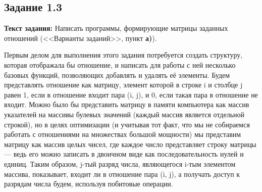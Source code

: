 \documentclass[12pt]{article}
\begin{document}
	
	\subsection{Задание 1.3}
	\label{subpart1_3}
	
	{\bf Текст задания:} Написать программы, формирующие матрицы заданных отношений (<<Варианты заданий>>, пункт {\bf а)}).
	
	Первым делом для выполнения этого задания потребуется создать структуру, которая отображала бы отношение, и написать для работы с ней несколько базовых функций, позволяющих добавлять и удалять её элементы. Будем представлять отношение как матрицу, элемент которой в строке i и столбце j равен 1, если в отношение входит пара (i, j), и 0, если такая пара в отношение не входит. Можно было бы представить матрицу в памяти компьютера как массив указателей на массивы булевых значений (каждый массив является отдельной строкой), но в целях оптимизации (и учитывая тот факт, что мы не собираемся работать с отношениями на множествах большой мощности) мы представим матрицу как массив целых чисел, где каждое число представляет строку матрицы --- ведь его можно записать в двоичном виде как последовательность нулей и единиц. Таким образом, j-тый разряд числа, являющегося i-тым элементом массива, показывает, входит ли в отношение пара (i, j), а получать доступ к разрядам числа будем, используя побитовые операции.
	
\end{document}
